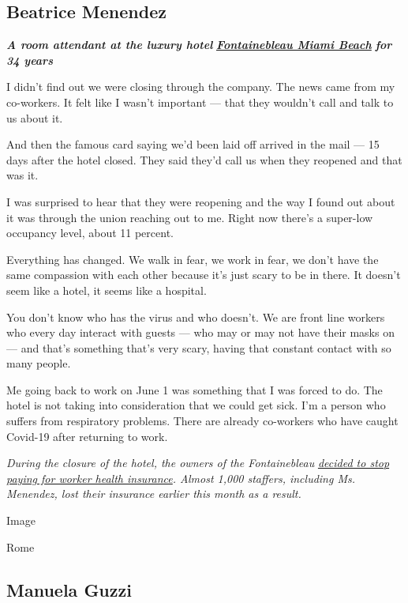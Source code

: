 \hypertarget{beatrice-menendez}{%
\subsection{Beatrice Menendez}\label{beatrice-menendez}}

\emph{\textbf{A room attendant at the luxury hotel}}
\textbf{\href{https://www.fontainebleau.com/}{\emph{Fontainebleau Miami
Beach}}} \emph{\textbf{for 34 years}}

I didn't find out we were closing through the company. The news came
from my co-workers. It felt like I wasn't important --- that they
wouldn't call and talk to us about it.

And then the famous card saying we'd been laid off arrived in the mail
--- 15 days after the hotel closed. They said they'd call us when they
reopened and that was it.

I was surprised to hear that they were reopening and the way I found out
about it was through the union reaching out to me. Right now there's a
super-low occupancy level, about 11 percent.

Everything has changed. We walk in fear, we work in fear, we don't have
the same compassion with each other because it's just scary to be in
there. It doesn't seem like a hotel, it seems like a hospital.

You don't know who has the virus and who doesn't. We are front line
workers who every day interact with guests --- who may or may not have
their masks on --- and that's something that's very scary, having that
constant contact with so many people.

Me going back to work on June 1 was something that I was forced to do.
The hotel is not taking into consideration that we could get sick. I'm a
person who suffers from respiratory problems. There are already
co-workers who have caught Covid-19 after returning to work.

\emph{During the closure of the hotel, the owners of the Fontainebleau}
\href{https://www.miamiherald.com/news/business/tourism-cruises/article243908132.html}{\emph{decided
to stop paying for worker health insurance}}\emph{. Almost 1,000
staffers, including Ms. Menendez, lost their insurance earlier this
month as a result.}

Image

Rome

\hypertarget{manuela-guzzi}{%
\subsection{Manuela Guzzi}\label{manuela-guzzi}}

